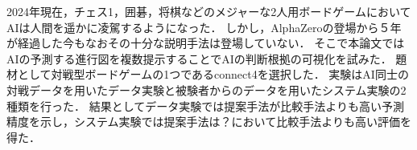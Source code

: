 \abstract
2024年現在，チェス1，囲碁，将棋などのメジャーな2人用ボードゲームにおいてAIは人間を遥かに凌駕するようになった\cite{Nikkei}\cite{deepBlue}\cite{dennou}．
しかし，AlphaZero\cite{AlphaZero}の登場から５年が経過した今もなおその十分な説明手法は登場していない．
そこで本論文ではAIの予測する進行図を複数提示することでAIの判断根拠の可視化を試みた．
題材として対戦型ボードゲームの1つであるconnect4\cite{connect4}を選択した．
実験はAI同士の対戦データを用いたデータ実験と被験者からのデータを用いたシステム実験の2種類を行った．
結果としてデータ実験では提案手法が比較手法よりも高い予測精度を示し，システム実験では提案手法は？において比較手法よりも高い評価を得た．